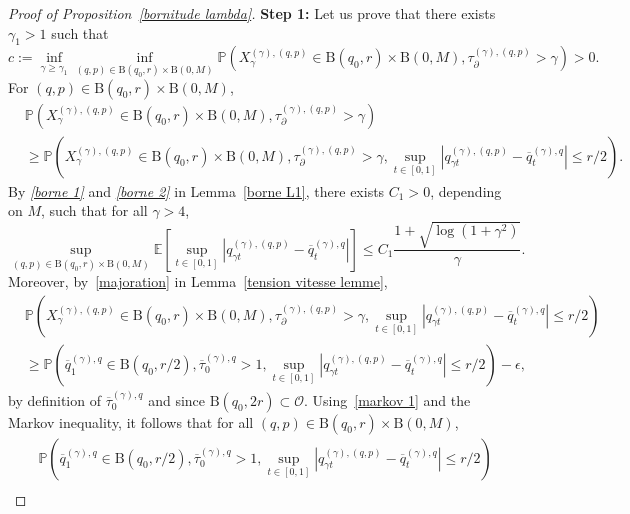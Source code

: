 \documentclass[preprint,EJP]{ejpecp}
\begin{document}
\begin{proof}[Proof of Proposition~\ref{bornitude lambda}]
\noindent\textbf{Step 1:} Let us prove that there exists $\gamma_1>1$ such that
\begin{equation}\label{minoration 2}
    c:=\inf_{\gamma\geq\gamma_1}\inf_{(q,p)\in\mathrm{B}(q_0,r)\times\mathrm{B}(0,M)}\mathbb{P}\left(X^{(\gamma),(q,p)}_{\gamma}\in \mathrm{B}(q_0,r)\times\mathrm{B}(0,M),\tau^{(\gamma),(q,p)}_{\partial}>\gamma\right)>0. 
\end{equation} For $(q,p)\in\mathrm{B}(q_0,r)\times\mathrm{B}(0,M)$, 
\begin{align}
 &\mathbb{P}\left(X^{(\gamma),(q,p)}_{\gamma}\in \mathrm{B}(q_0,r)\times\mathrm{B}(0,M),\tau^{(\gamma),(q,p)}_{\partial}>\gamma\right)\nonumber\\
 &\geq\mathbb{P}\left(X^{(\gamma),(q,p)}_{\gamma}\in \mathrm{B}(q_0,r)\times\mathrm{B}(0,M),\tau^{(\gamma),(q,p)}_{\partial}>\gamma,\sup_{t\in[0,1]}\left\vert q^{(\gamma),(q,p)}_{\gamma t}-\overline{q}^{(\gamma),q}_t\right\vert\leq r/2\right).\label{minoration}
\end{align}  
By \emph{\eqref{borne 1}} and \emph{\eqref{borne 2}} in Lemma~\ref{borne L1}, there exists $C_1>0$, depending on $M$, such that for all $\gamma>4$, 
\begin{equation}\label{markov 1}
    \sup_{(q,p)\in \mathrm{B}(q_0,r)\times\mathrm{B}(0,M)}\mathbb{E}\left[\sup_{t\in[0,1]}\left\vert q^{(\gamma),(q,p)}_{\gamma t}-\overline{q}^{(\gamma),q}_t\right\vert\right]\leq C_1\frac{1+\sqrt{\log(1+\gamma^2)}}{\gamma}. 
\end{equation} 
Moreover, by~\eqref{majoration} in Lemma~\ref{tension vitesse lemme}, 
\begin{align*}
    &\mathbb{P}\left(X^{(\gamma),(q,p)}_{\gamma}\in \mathrm{B}(q_0,r)\times\mathrm{B}(0,M),\tau^{(\gamma),(q,p)}_{\partial}>\gamma,\sup_{t\in[0,1]}\left\vert q^{(\gamma),(q,p)}_{\gamma t}-\overline{q}^{(\gamma),q}_t\right\vert\leq r/2\right)\\
    &\geq\mathbb{P}\left(\overline{q}^{(\gamma),q}_1\in \mathrm{B}(q_0,r/2),\overline{\tau}^{(\gamma),q}_0>1,\sup_{t\in[0,1]}\left\vert q^{(\gamma),(q,p)}_{\gamma t}-\overline{q}^{(\gamma),q}_t\right\vert\leq r/2\right)-\epsilon, 
\end{align*}
by definition of $\overline{\tau}^{(\gamma),q}_0$ and since $\mathrm{B}(q_0,2r)\subset\mathcal{O}$. Using~\eqref{markov 1} and the Markov inequality, it follows that for all $(q,p)\in \mathrm{B}(q_0,r)\times\mathrm{B}(0,M)$, 
\begin{align*}
    &\mathbb{P}\left(\overline{q}^{(\gamma),q}_1\in \mathrm{B}(q_0,r/2),\overline{\tau}^{(\gamma),q}_0>1,\sup_{t\in[0,1]}\left\vert q^{(\gamma),(q,p)}_{\gamma t}-\overline{q}^{(\gamma),q}_t\right\vert\leq r/2\right)\\

\end{align*}
\end{proof}
\end{document}
